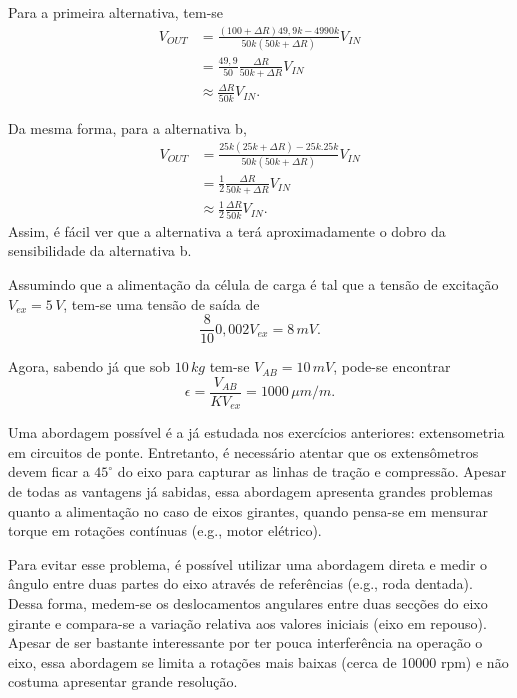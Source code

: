 \documentclass[a4paper]{report}
\begin{document}

Para a primeira alternativa, tem-se
\begin{align*}
    V_{OUT} &= \frac{\left( 100+\Delta R \right) 49,9k - 4990k}{50k\left( 50k + \Delta R \right) } V_{IN} \\
    &= \frac{49,9}{50}\frac{\Delta R}{50k + \Delta R} V_{IN} \\
    &\approx \frac{\Delta R}{50k}V_{IN}
.\end{align*}

Da mesma forma, para a alternativa b,
\begin{align*}
    V_{OUT} &= \frac{25k\left( 25k + \Delta R \right) -25k.25k}{50k\left( 50k + \Delta R \right) } V_{IN} \\
    &= \frac{1}{2}\frac{\Delta R}{50k + \Delta R} V_{IN} \\
    &\approx \frac{1}{2}\frac{\Delta R}{50k}V_{IN}
.\end{align*}
Assim, é fácil ver que a alternativa a terá aproximadamente o dobro da sensibilidade da alternativa b.



Assumindo que a alimentação da célula de carga é tal que a tensão de excitação $V_{ex} = 5\,V$, tem-se uma tensão de saída de \[
\frac{8}{10}0,002 V_{ex} = 8\,mV
.\] 


Agora, sabendo já que sob $10\,kg$ tem-se $V_{AB} = 10\,mV$, pode-se encontrar \[
\epsilon = \frac{V_{AB}}{K V_{ex}} = 1000\,\mu m / m
.\]


Uma abordagem possível é a já estudada nos exercícios anteriores: extensometria em circuitos de ponte. Entretanto, é necessário atentar que os extensômetros devem ficar a $45^\circ$ do eixo para capturar as linhas de tração e compressão. Apesar de todas as vantagens já sabidas, essa abordagem apresenta grandes problemas quanto a alimentação no caso de eixos girantes, quando pensa-se em mensurar torque em rotações contínuas (e.g., motor elétrico).

Para evitar esse problema, é possível utilizar uma abordagem direta e medir o ângulo entre duas partes do eixo através de referências (e.g., roda dentada). Dessa forma, medem-se os deslocamentos angulares entre duas secções do eixo girante e compara-se a variação relativa aos valores iniciais (eixo em repouso). Apesar de ser bastante interessante por ter pouca interferência na operação o eixo, essa abordagem se limita a rotações mais baixas (cerca de 10000 rpm) e não costuma apresentar grande resolução.
\end{document}
